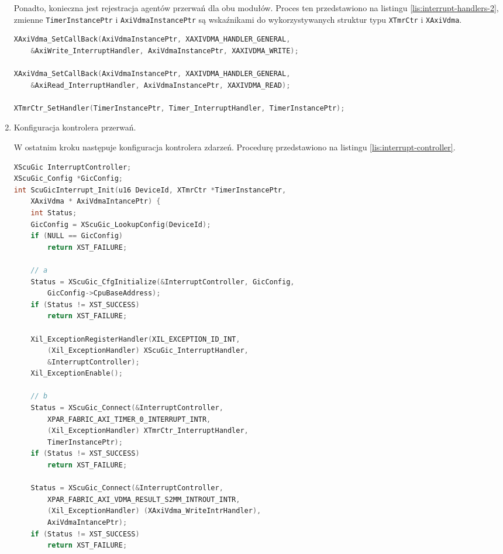 \begin{enumerate}
Ponadto, konieczna jest rejestracja agentów przerwań dla obu modułów. 
Proces ten przedstawiono na listingu \ref{lis:interrupt-handlers-2}, zmienne \texttt{TimerInstancePtr} i \texttt{AxiVdmaInstancePtr} są wskaźnikami do wykorzystywanych struktur typu \texttt{XTmrCtr} i \texttt{XAxiVdma}.

\begin{lstlisting}[language=C, caption=Rejestracja agentów przerwań., label=lis:interrupt-handlers-2]
XAxiVdma_SetCallBack(AxiVdmaInstancePtr, XAXIVDMA_HANDLER_GENERAL,
	&AxiWrite_InterruptHandler, AxiVdmaInstancePtr, XAXIVDMA_WRITE);

XAxiVdma_SetCallBack(AxiVdmaInstancePtr, XAXIVDMA_HANDLER_GENERAL,
	&AxiRead_InterruptHandler, AxiVdmaInstancePtr, XAXIVDMA_READ);

XTmrCtr_SetHandler(TimerInstancePtr, Timer_InterruptHandler, TimerInstancePtr);
\end{lstlisting}

	\item Konfiguracja kontrolera przerwań.
	
W ostatnim kroku następuje konfiguracja kontrolera zdarzeń. Procedurę przedstawiono na listingu \ref{lis:interrupt-controller}.

\begin{lstlisting}[language=C, caption=Konfiguracja kontrolera przerwań., label=lis:interrupt-controller]
XScuGic InterruptController;
XScuGic_Config *GicConfig;
int ScuGicInterrupt_Init(u16 DeviceId, XTmrCtr *TimerInstancePtr,
	XAxiVdma * AxiVdmaIntancePtr) {
	int Status;
	GicConfig = XScuGic_LookupConfig(DeviceId);
	if (NULL == GicConfig)
		return XST_FAILURE;
	
	// a
	Status = XScuGic_CfgInitialize(&InterruptController, GicConfig,
		GicConfig->CpuBaseAddress);
	if (Status != XST_SUCCESS)
		return XST_FAILURE;
	
	Xil_ExceptionRegisterHandler(XIL_EXCEPTION_ID_INT,
		(Xil_ExceptionHandler) XScuGic_InterruptHandler,
		&InterruptController);
	Xil_ExceptionEnable();
	
	// b
	Status = XScuGic_Connect(&InterruptController,
		XPAR_FABRIC_AXI_TIMER_0_INTERRUPT_INTR,
		(Xil_ExceptionHandler) XTmrCtr_InterruptHandler,
		TimerInstancePtr);
	if (Status != XST_SUCCESS)
		return XST_FAILURE;
	
	Status = XScuGic_Connect(&InterruptController,
		XPAR_FABRIC_AXI_VDMA_RESULT_S2MM_INTROUT_INTR,
		(Xil_ExceptionHandler) (XAxiVdma_WriteIntrHandler),
		AxiVdmaIntancePtr);
	if (Status != XST_SUCCESS)
		return XST_FAILURE;
	

\end{lstlisting}
\end{enumerate}
